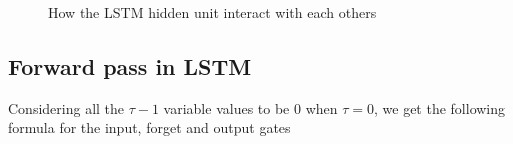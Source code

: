 \begin{figure}[H]
\begin{center}
\caption{\label{fig:Lstmall}How the LSTM hidden unit interact with each others}
\end{center}
\end{figure}


\subsection{Forward pass in LSTM}

Considering all the $\tau-1$ variable values to be $0$ when $\tau=0$, we get the following formula for the input, forget and output gates

